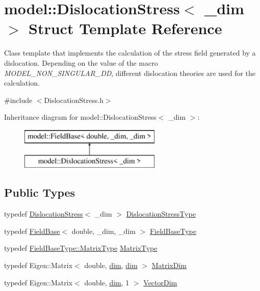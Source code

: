 \hypertarget{structmodel_1_1_dislocation_stress}{}\section{model\+:\+:Dislocation\+Stress$<$ \+\_\+dim $>$ Struct Template Reference}
\label{structmodel_1_1_dislocation_stress}


Class template that implements the calculation of the stress field generated by a dislocation. Depending on the value of the macro {\itshape M\+O\+D\+E\+L\+\_\+\+N\+O\+N\+\_\+\+S\+I\+N\+G\+U\+L\+A\+R\+\_\+\+D\+D}, different dislocation theories are used for the calculation.  




{\ttfamily \#include $<$Dislocation\+Stress.\+h$>$}

Inheritance diagram for model\+:\+:Dislocation\+Stress$<$ \+\_\+dim $>$\+:\begin{figure}[H]
\begin{center}
\leavevmode
\includegraphics[height=2.000000cm]{structmodel_1_1_dislocation_stress}
\end{center}
\end{figure}
\subsection*{Public Types}
\begin{DoxyCompactItemize}
\item 
typedef \hyperlink{structmodel_1_1_dislocation_stress}{Dislocation\+Stress}$<$ \+\_\+dim $>$ \hyperlink{structmodel_1_1_dislocation_stress_a91be77696dd95f550d7b6fae004a4c1a}{Dislocation\+Stress\+Type}
\item 
typedef \hyperlink{structmodel_1_1_field_base}{Field\+Base}$<$ double, \+\_\+dim, \+\_\+dim $>$ \hyperlink{structmodel_1_1_dislocation_stress_ad7890f960ed6c1a4719c5621ac98c6e5}{Field\+Base\+Type}
\item 
typedef \hyperlink{structmodel_1_1_field_base_a2a46afe1dafac6e3d1c95d32fc9a58a3}{Field\+Base\+Type\+::\+Matrix\+Type} \hyperlink{structmodel_1_1_dislocation_stress_a58cfb5429639657d58da42d9c3854505}{Matrix\+Type}
\item 
typedef Eigen\+::\+Matrix$<$ double, \hyperlink{structmodel_1_1_dislocation_stress_acd45411c1dd348187e8a3ecdda35d793}{dim}, \hyperlink{structmodel_1_1_dislocation_stress_acd45411c1dd348187e8a3ecdda35d793}{dim} $>$ \hyperlink{structmodel_1_1_dislocation_stress_a2cf61e24522b244ae3024b58195d8e6e}{Matrix\+Dim}
\item 
typedef Eigen\+::\+Matrix$<$ double, \hyperlink{structmodel_1_1_dislocation_stress_acd45411c1dd348187e8a3ecdda35d793}{dim}, 1 $>$ \hyperlink{structmodel_1_1_dislocation_stress_ac1462cad65fdf33aa42341301aee8c48}{Vector\+Dim}
\end{DoxyCompactItemize}

